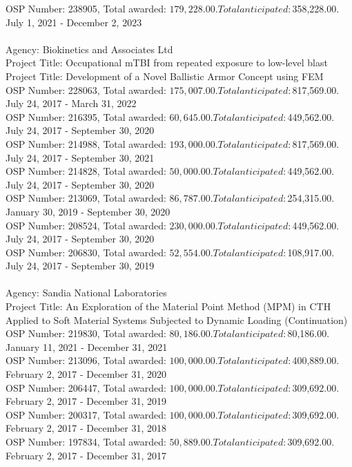 \documentclass[a4paper,10pt]{article}
\begin{document}
OSP Number: 238905, Total awarded: $179,228.00. Total anticipated: $358,228.00. July 1, 2021 - December 2, 2023\\
\\[12pt]
Agency: Biokinetics and Associates Ltd\\
Project Title: Occupational mTBI from repeated exposure to low-level blast\\
Project Title: Development of a Novel Ballistic Armor Concept using FEM\\
OSP Number: 228063, Total awarded: $175,007.00. Total anticipated: $817,569.00. July 24, 2017 - March 31, 2022\\
OSP Number: 216395, Total awarded: $60,645.00. Total anticipated: $449,562.00. July 24, 2017 - September 30, 2020\\
OSP Number: 214988, Total awarded: $193,000.00. Total anticipated: $817,569.00. July 24, 2017 - September 30, 2021\\
OSP Number: 214828, Total awarded: $50,000.00. Total anticipated: $449,562.00. July 24, 2017 - September 30, 2020\\
OSP Number: 213069, Total awarded: $86,787.00. Total anticipated: $254,315.00. January 30, 2019 - September 30, 2020\\
OSP Number: 208524, Total awarded: $230,000.00. Total anticipated: $449,562.00. July 24, 2017 - September 30, 2020\\
OSP Number: 206830, Total awarded: $52,554.00. Total anticipated: $108,917.00. July 24, 2017 - September 30, 2019\\
\\[12pt]
Agency: Sandia National Laboratories\\
Project Title: An Exploration of the Material Point Method (MPM) in CTH Applied to Soft Material Systems Subjected to Dynamic Loading (Continuation)\\
OSP Number: 219830, Total awarded: $80,186.00. Total anticipated: $80,186.00. January 11, 2021 - December 31, 2021\\
OSP Number: 213096, Total awarded: $100,000.00. Total anticipated: $400,889.00. February 2, 2017 - December 31, 2020\\
OSP Number: 206447, Total awarded: $100,000.00. Total anticipated: $309,692.00. February 2, 2017 - December 31, 2019\\
OSP Number: 200317, Total awarded: $100,000.00. Total anticipated: $309,692.00. February 2, 2017 - December 31, 2018\\
OSP Number: 197834, Total awarded: $50,889.00. Total anticipated: $309,692.00. February 2, 2017 - December 31, 2017\\
\end{document}
